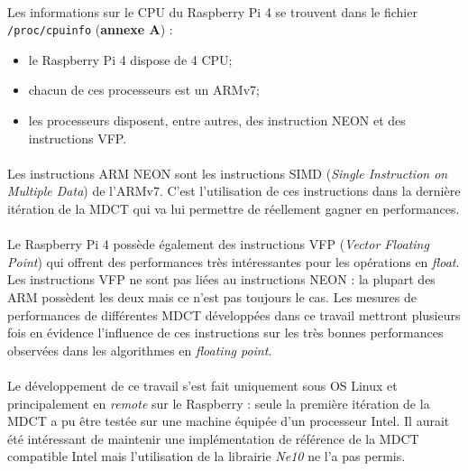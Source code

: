 \documentclass{article}
\begin{document}
    \paragraph{}
    Les informations sur le CPU du Raspberry Pi 4 se trouvent dans le fichier \texttt{/proc/cpuinfo} (\textbf{annexe A}) :
    \begin{itemize}
        \item le Raspberry Pi 4 dispose de 4 CPU;
        \item chacun de ces processeurs est un ARMv7;
        \item les processeurs disposent, entre autres, des instruction NEON et des instructions VFP.
    \end{itemize}

    \paragraph{}
    Les instructions ARM NEON sont les instructions SIMD (\emph{Single Instruction on Multiple Data}) de l'ARMv7. C'est l'utilisation de ces instructions dans la dernière itération de la MDCT qui va lui permettre de réellement gagner en performances.

    \paragraph{}
    Le Raspberry Pi 4 possède également des instructions VFP (\emph{Vector Floating Point}) qui offrent des performances très intéressantes pour les opérations en \emph{float}. Les instructions VFP ne sont pas liées au instructions NEON : la plupart des ARM possèdent les deux mais ce n'est pas toujours le cas. Les mesures de performances de différentes MDCT développées dans ce travail mettront plusieurs fois en évidence l'influence de ces instructions sur les très bonnes performances observées dans les algorithmes en \emph{floating point}.

    \paragraph{}
    Le développement de ce travail s'est fait uniquement sous OS Linux et principalement en \emph{remote} sur le Raspberry : seule la première itération de la MDCT a pu être testée sur une machine équipée d'un processeur Intel. Il aurait été intéressant de maintenir une implémentation de référence de la MDCT compatible Intel mais l'utilisation de la librairie \emph{Ne10} ne l'a pas permis.
\end{document}
